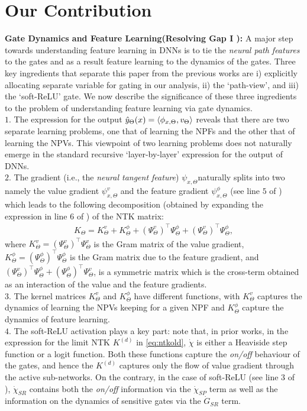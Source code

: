 \section{Our Contribution}
\textbf{Gate Dynamics and Feature Learning(Resolving Gap I ):}
A major step towards understanding feature learning in DNNs is to tie the \emph{neural path features} to the gates and as a result feature learning to the dynamics of the gates. Three key ingredients that separate this paper from the previous works are i) explicitly allocating separate variable for gating in our analysis, ii) the `path-view', and iii) the `soft-ReLU' gate. We now describe the significance of these three ingredients to the problem of understanding feature learning via gate dynamics.\\
$1.$ The expression for the output $\hat{y}_{\Theta}(x)=\langle \phi_{x,\Theta},v_{\Theta}\rangle$ reveals that there are two separate learning problems, one that of learning the NPFs and the other that of learning the NPVs. This viewpoint of two learning problems does not naturally emerge in the standard recursive `layer-by-layer' expression for the output of DNNs.\\
$2.$ The gradient (i.e., the \emph{neural tangent feature}) $\psi_{x,\Theta} $naturally splits into two namely the value gradient $\psi^v_{x,\Theta}$ and the feature gradient $\psi^{\phi}_{x,\Theta}$ (see line $5$ of ) which leads to the following  decomposition (obtained by expanding the expression in  line $6$ of ) of the NTK matrix:
\begin{align}
K_{\Theta}=K^v_{\Theta}+K^{\phi}_{\Theta}+(\Psi^v_{\Theta})^\top \Psi^{\phi}_{\Theta}+(\Psi^v_{\Theta})^\top\Psi^{\phi}_{\Theta},
\end{align}
where $K^v_{\Theta}=(\Psi^v_{\Theta})^\top \Psi^v_{\Theta}$ is the Gram matrix of the value gradient, $K^{\phi}_{\Theta}=(\Psi^{\phi}_{\Theta})^\top \Psi^{\phi}_{\Theta}$ is the Gram matrix due to the feature gradient, and $(\Psi^v_\Theta)^\top \Psi^{\phi}_{\Theta} +(\Psi^{\phi}_\Theta)^\top \Psi^{v}_{\Theta}$, is a symmetric matrix which is the cross-term obtained as an interaction of the value and the feature gradients.\\
$3.$ The kernel matrices $K^v_{\Theta}$ and $K^{\phi}_{\Theta}$ have different functions, with $K^v_{\Theta}$ captures the dynamics of learning the NPVs keeping for a given NPF and $K^{\phi}_{\Theta}$ capture the dynamics of feature learning.\\
$4.$ The soft-ReLU activation plays a key part: note that, in prior works, in the expression for the limit NTK $K^{(d)}$ in \eqref{eq:ntkold}, $\dot{\chi}$ is either a Heaviside step function or a logit function. Both these functions capture the \emph{on/off} behaviour of the gates, and hence the $K^{(d)}$ captures only the flow of value gradient through the active sub-networks. On the contrary, in the case of soft-ReLU (see line $3$ of ), $\dot{\chi}_{SR}$ contains both the \emph{on/off} information via the $\dot{\chi}_{SP}$ term as well as the information on the dynamics of sensitive gates via the $\dot{G}_{SR}$ term.
